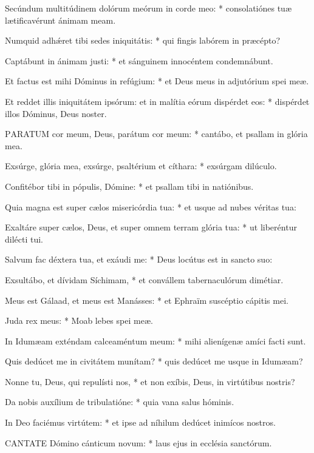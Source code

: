 Secúndum multitúdinem dolórum meórum in corde meo: * consolatiónes tuæ lætificavérunt ánimam meam.

Numquid adhǽret tibi sedes iniquitátis: * qui fingis labórem in præcépto?

Captábunt in ánimam justi: * et sánguinem innocéntem condemnábunt.

Et factus est mihi Dóminus in refúgium: * et Deus meus in adjutórium spei meæ.

Et reddet illis iniquitátem ipsórum: et in malítia eórum dispérdet eos: * dispérdet illos Dóminus, Deus noster.


\lettrine[lines=2]{P}{ARATUM} cor meum, Deus, parátum cor meum: * cantábo, et psallam in glória mea.

Exsúrge, glória mea, exsúrge, psaltérium et cíthara: * exsúrgam dilúculo.

Confitébor tibi in pópulis, Dómine: * et psallam tibi in natiónibus.

Quia magna est super cælos misericórdia tua: * et usque ad nubes véritas tua:

Exaltáre super cælos, Deus, et super omnem terram glória tua: * ut liberéntur dilécti tui.

Salvum fac déxtera tua, et exáudi me: * Deus locútus est in sancto suo:

Exsultábo, et dívidam Síchimam, * et convállem tabernaculórum dimétiar.

Meus est Gálaad, et meus est Manásses: * et Ephraïm suscéptio cápitis mei.

Juda rex meus: * Moab lebes spei meæ.

In Idumæam exténdam calceaméntum meum: * mihi alienígenæ amíci facti sunt.

Quis dedúcet me in civitátem munítam? * quis dedúcet me usque in Idumæam?

Nonne tu, Deus, qui repulísti nos, * et non exíbis, Deus, in virtútibus nostris?

Da nobis auxílium de tribulatióne: * quia vana salus hóminis.

In Deo faciémus virtútem: * et ipse ad níhilum dedúcet inimícos nostros.



\lettrine[lines=2]{C}{ANTATE} Dómino cánticum novum: * laus ejus in ecclésia sanctórum.

